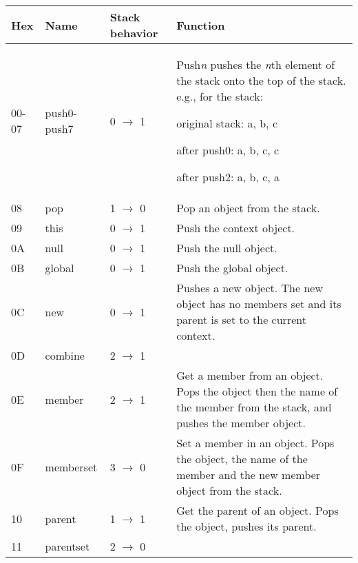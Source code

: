 \begin{longtable}{ | l | l | l | X | }
\hline
\textbf{Hex} & \textbf{Name} & \textbf{Stack behavior} & \textbf{Function} \\
\hline\hline
00-07 & push0-push7 & 0 $\rightarrow$ 1 & Push\textit{n} pushes the \textit{n}th element of the stack onto the top of the stack. e.g., for the stack:

original stack: a, b, c

after push0: a, b, c, c

after push2: a, b, c, a \\
\hline
08 & pop & 1 $\rightarrow$ 0 & Pop an object from the stack. \\
\hline
09 & this & 0 $\rightarrow$ 1 & Push the context object. \\
\hline
0A & null & 0 $\rightarrow$ 1 & Push the null object. \\
\hline
0B & global & 0 $\rightarrow$ 1 & Push the global object. \\
\hline
0C & new & 0 $\rightarrow$ 1 & Pushes a new object. The new object has no members set and its parent is set to the current context. \\
\hline
0D & combine & 2 $\rightarrow$ 1 &  \\
\hline
0E & member & 2 $\rightarrow$ 1 & Get a member from an object. Pops the object then the name of the member from the stack, and pushes the member object. \\
\hline
0F & memberset & 3 $\rightarrow$ 0 & Set a member in an object. Pops the object, the name of the member and the new member object from the stack. \\
\hline
10 & parent & 1 $\rightarrow$ 1 & Get the parent of an object. Pops the object, pushes its parent. \\
\hline
11 & parentset & 

2 $\rightarrow$ 0 & 


\end{longtable}

